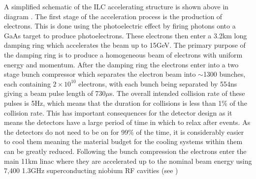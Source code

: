 A simplified schematic of the \ac{ILC} accelerating structure is shown above in diagram . The first stage of the acceleration process is the production of electrons. This is done using the photoelectric effect by firing photons onto a GaAs target to produce photoelectrons. These electrons then enter a 3.2km long damping ring which accelerates the beam up to 15GeV. The primary purpose of the damping ring is to produce a homogeneous beam of electrons with uniform energy and momentum. After the damping ring the electrons enter into a two stage bunch compressor which separates the electron beam into ${\sim}$1300 bunches, each containing ${2\times10^{10}}$ electrons, with each bunch being separated by 554ns giving a beam pulse length of 730${\mu}$s. The overall intended collision rate of these pulses is 5Hz, which means that the duration for collisions is less than 1\% of the collision rate. This has important consequences for the detector design as it means the detectors have a large period of time in which to relax after events. As the detectors do not need to be on for 99\% of the time, it is considerably easier to cool them meaning the material budget for the cooling systems within them can be greatly reduced. Following the bunch compression the electrons enter the main 11km linac where they are accelerated up to the nominal beam energy using 7,400 1.3GHz superconducting niobium \ac{RF} cavities (see ) 

